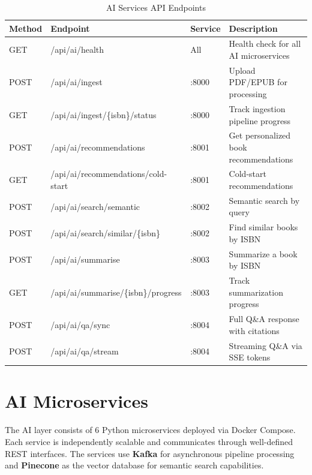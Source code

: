 \begin{table}[H]
\centering
\caption{AI Services API Endpoints}
\begin{tabularx}{\textwidth}{|l|l|l|X|}
\hline
\textbf{Method} & \textbf{Endpoint} & \textbf{Service} & \textbf{Description} \\
\hline
GET  & /api/ai/health              & All       & Health check for all AI microservices \\
\hline
POST & /api/ai/ingest              & :8000     & Upload PDF/EPUB for processing \\
\hline
GET  & /api/ai/ingest/\{isbn\}/status & :8000  & Track ingestion pipeline progress \\
\hline
POST & /api/ai/recommendations     & :8001     & Get personalized book recommendations \\
\hline
GET  & /api/ai/recommendations/cold-start & :8001 & Cold-start recommendations \\
\hline
POST & /api/ai/search/semantic     & :8002     & Semantic search by query \\
\hline
POST & /api/ai/search/similar/\{isbn\} & :8002 & Find similar books by ISBN \\
\hline
POST & /api/ai/summarise           & :8003     & Summarize a book by ISBN \\
\hline
GET  & /api/ai/summarise/\{isbn\}/progress & :8003 & Track summarization progress \\
\hline
POST & /api/ai/qa/sync             & :8004     & Full Q\&A response with citations \\
\hline
POST & /api/ai/qa/stream           & :8004     & Streaming Q\&A via SSE tokens \\
\hline
\end{tabularx}
\end{table}

\section{AI Microservices}
\label{sec:ch4ai}

The AI layer consists of 6 Python microservices deployed via Docker Compose.
Each service is independently scalable and communicates through well-defined
REST interfaces. The services use \textbf{Kafka} for asynchronous pipeline
processing and \textbf{Pinecone} as the vector database for semantic search
capabilities.

